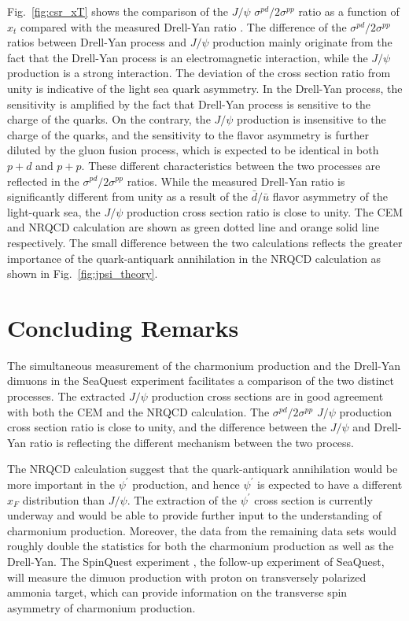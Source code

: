 \documentclass[10pt,a4paper,final]{article}
\begin{document}
Fig.~\ref{fig:csr_xT} shows the comparison of the $J/\psi$ $\sigma^{pd}/2\sigma^{pp}$ ratio
as a function of $x_t$ compared with the measured Drell-Yan ratio \cite{dove2021}.
The difference of the $\sigma^{pd}/2\sigma^{pp}$ ratios between Drell-Yan process and $J/\psi$ 
production mainly originate from the fact that the Drell-Yan process is an electromagnetic 
interaction, while the $J/\psi$ production is a strong interaction. The deviation of the cross
section ratio from unity is indicative of the light sea quark asymmetry. In the Drell-Yan
process, the sensitivity is amplified by the fact that Drell-Yan process is sensitive to the charge of the quarks.
On the contrary, the $J/\psi$ production is insensitive to the charge of the quarks, and the sensitivity to the flavor asymmetry is
further diluted by the gluon fusion process, which is expected to be identical in both $p+d$ and $p+p$.
These
different characteristics between the two processes are reflected in the
$\sigma^{pd}/2\sigma^{pp}$ ratios. While the measured Drell-Yan ratio
is significantly different from unity as a result of the $\bar{d}/\bar{u}$
flavor asymmetry of the light-quark sea, the $J/\psi$ production cross section ratio
is close to unity.
The CEM and NRQCD calculation are shown as green dotted line and orange solid line
respectively. The small difference between the two calculations reflects the greater
importance of the quark-antiquark annihilation in the NRQCD calculation as shown in
Fig.~\ref{fig:jpsi_theory}.

\section{Concluding Remarks}
The simultaneous measurement of the charmonium production and the Drell-Yan dimuons
in the SeaQuest experiment facilitates a comparison of the two distinct processes. The
extracted $J/\psi$ production cross sections are in good agreement with both the CEM
and the NRQCD calculation. The $\sigma^{pd}/2\sigma^{pp}$ $J/\psi$ production cross section ratio
is close to unity, and the difference between the $J/\psi$ and Drell-Yan
ratio is reflecting the different mechanism between the two process.

The NRQCD calculation suggest that the quark-antiquark annihilation would
be more important in the $\psi^\prime$ production, and hence $\psi^\prime$ is expected
to have a different $x_F$ distribution than $J/\psi$. The extraction of the $\psi^\prime$
cross section is currently underway and would be able to provide further input to
the understanding of charmonium production. Moreover, the data from the remaining
data sets would roughly double the statistics for both the charmonium production as well as the Drell-Yan.
The SpinQuest experiment \cite{geesaman2014}, the follow-up experiment of SeaQuest, will measure the dimuon
production with proton on transversely polarized ammonia target, which can provide information
on the transverse spin asymmetry of charmonium production.

\printbibliography[heading=bibintoc,title={References}]
\end{document}
